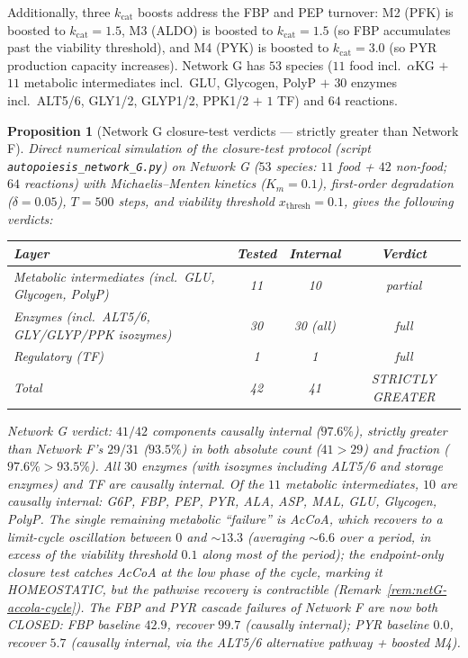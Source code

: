 \documentclass[11pt,a4paper]{article}
\theoremstyle{plain}
\newtheorem{proposition}[theorem]{Proposition}
\theoremstyle{definition}
\theoremstyle{remark}
\begin{document}
Additionally, three $k_{\mathrm{cat}}$ boosts address the FBP and PEP
turnover: M2 (PFK) is boosted to $k_{\mathrm{cat}} = 1.5$, M3 (ALDO)
is boosted to $k_{\mathrm{cat}} = 1.5$ (so FBP accumulates past the
viability threshold), and M4 (PYK) is boosted to $k_{\mathrm{cat}} =
3.0$ (so PYR production capacity increases). Network G has $53$ species
($11$ food incl.~$\alpha$KG $+$ $11$ metabolic intermediates incl.~GLU,
Glycogen, PolyP $+$ $30$ enzymes incl.~ALT5/6, GLY1/2, GLYP1/2, PPK1/2
$+$ $1$ TF) and $64$ reactions.

\begin{proposition}[Network G closure-test verdicts --- strictly
greater than Network F]
\label{prop:netG-verdict}
Direct numerical simulation of the closure-test protocol
(script \texttt{autopoiesis\_network\_G.py}) on Network G
($53$ species: $11$ food + $42$ non-food; $64$ reactions) with
Michaelis--Menten kinetics ($K_m = 0.1$), first-order degradation
($\delta = 0.05$), $T = 500$ steps, and viability threshold
$x_{\mathrm{thresh}} = 0.1$, gives the following verdicts:
\begin{center}\footnotesize
\begin{tabular}{lccc}
\toprule
Layer & Tested & Internal & Verdict \\
\midrule
Metabolic intermediates (incl.~GLU, Glycogen, PolyP) & 11 & 10 & partial \\
Enzymes (incl.~ALT5/6, GLY/GLYP/PPK isozymes) & 30 & 30 (all) & full \\
Regulatory (TF) & 1 & 1 & full \\
\midrule
Total & 42 & 41 & STRICTLY GREATER \\
\bottomrule
\end{tabular}
\end{center}
Network G verdict: $41/42$ components causally internal ($97.6\%$),
strictly greater than Network F's $29/31$ ($93.5\%$) in both absolute
count ($41 > 29$) and fraction ($97.6\% > 93.5\%$). All $30$ enzymes
(with isozymes including ALT5/6 and storage enzymes) and TF are
causally internal. Of the $11$ metabolic intermediates, $10$ are
causally internal: G6P, FBP, PEP, PYR, ALA, ASP, MAL, GLU, Glycogen,
PolyP. The single remaining metabolic ``failure'' is AcCoA, which
recovers to a limit-cycle oscillation between $0$ and $\sim 13.3$
(averaging $\sim 6.6$ over a period, in excess of the viability
threshold $0.1$ along most of the period); the endpoint-only closure
test catches AcCoA at the low phase of the cycle, marking it
HOMEOSTATIC, but the pathwise recovery is contractible
(Remark~\ref{rem:netG-accola-cycle}). The FBP and PYR cascade failures
of Network F are now both CLOSED: FBP baseline $42.9$, recover $99.7$
(causally internal); PYR baseline $0.0$, recover $5.7$ (causally
internal, via the ALT5/6 alternative pathway + boosted M4).
\end{proposition}
\end{document}
